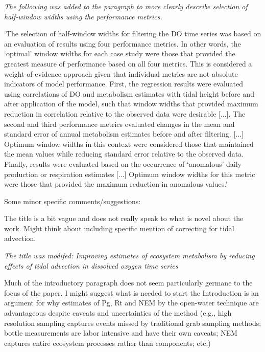 \documentclass[letterpaper,12pt]{article}\usepackage[]{graphicx}\usepackage[]{color}
\begin{document}
{\it The following was added to the paragraph to more clearly describe selection of half-window widths using the performance metrics.

`The selection of half-window widths for filtering the DO time series was based on an evaluation of results using four performance metrics.  In other words, the `optimal' window widths for each case study were those that provided the greatest measure of performance based on all four metrics.  This is considered a weight-of-evidence approach given that individual metrics are not absolute indicators of model performance.  First, the regression results were evaluated using correlations of DO and metabolism estimates with tidal height before and after application of the model, such that window widths that provided maximum reduction in correlation relative to the observed data were desirable [...]. The second and third performance metrics evaluated changes in the mean and standard error of annual metabolism estimates before and after filtering.  [...] Optimum window widths in this context were considered those that maintained the mean values while reducing standard error relative to the observed data. Finally, results were evaluated based on the occurrence of `anomalous' daily production or respiration estimates [...] Optimum window widths for this metric were those that provided the maximum reduction in anomalous values.'
}

Some minor specific comments/suggestions:

The title is a bit vague and does not really speak to what is novel about the work. Might think about including specific mention of correcting for tidal advection.

{\it The title was modifed: Improving estimates of ecosystem metabolism by reducing effects of tidal advection in dissolved oxygen time series}

Much of the introductory paragraph does not seem particularly germane to the focus of the paper. I might suggest what is needed to start the Introduction is an argument for why estimates of Pg, Rt and NEM by the open-water technique are advantageous despite caveats and uncertainties of the method (e.g., high resolution sampling captures events missed by traditional grab sampling methods; bottle measurements are labor intensive and have their own caveats; NEM captures entire ecosystem processes rather than components; etc.)
\end{document}
